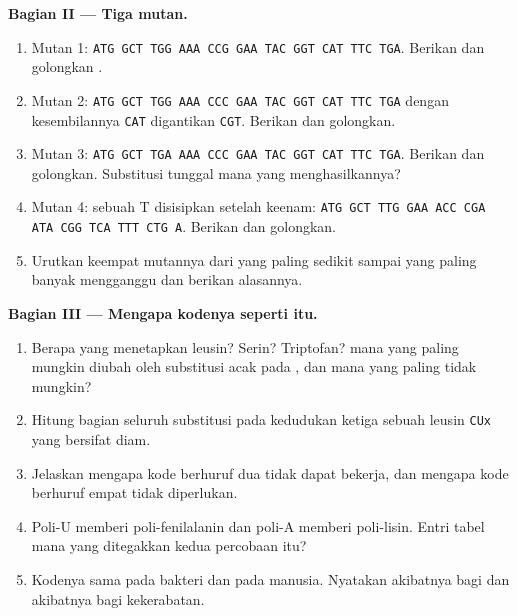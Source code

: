 \begin{problem}
\medskip
\noindent\textbf{Bagian II --- Tiga mutan.}
\begin{enumerate}[resume]
  \item Mutan 1: \texttt{ATG GCT TGG AAA CCG
        GAA TAC GGT CAT TTC TGA}. Berikan  dan golongkan .
  \item Mutan 2: \texttt{ATG GCT TGG AAA CCC
        GAA TAC GGT CAT TTC TGA} dengan  kesembilannya
        \texttt{CAT} digantikan \texttt{CGT}.
        Berikan  dan golongkan.
  \item Mutan 3: \texttt{ATG GCT TGA AAA CCC
        GAA TAC GGT CAT TTC TGA}. Berikan  dan golongkan.
        Substitusi tunggal mana yang
        menghasilkannya?
  \item Mutan 4: sebuah T disisipkan setelah  keenam:
        \texttt{ATG GCT TTG GAA ACC
        CGA ATA CGG TCA TTT CTG A}. Berikan  dan golongkan.
  \item Urutkan keempat mutannya dari yang paling sedikit sampai yang
        paling banyak mengganggu  dan berikan alasannya.
\end{enumerate}

\medskip
\noindent\textbf{Bagian III --- Mengapa kodenya seperti itu.}
\begin{enumerate}[resume]
  \item Berapa  yang menetapkan leusin? Serin? Triptofan?  mana yang paling mungkin diubah oleh substitusi acak pada
        , dan mana yang paling tidak mungkin?
  \item Hitung bagian seluruh substitusi pada kedudukan ketiga sebuah
         leusin \texttt{CUx} yang bersifat diam.
  \item Jelaskan mengapa kode berhuruf dua tidak dapat bekerja, dan
        mengapa kode berhuruf empat tidak diperlukan.
  \item Poli-U memberi poli-fenilalanin dan poli-A memberi poli-lisin.
        Entri tabel mana yang ditegakkan kedua percobaan itu?
  \item Kodenya sama pada bakteri dan pada manusia. Nyatakan akibatnya
        bagi  dan akibatnya bagi kekerabatan.
\end{enumerate}


\end{problem}
